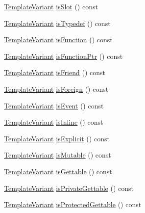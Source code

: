 \begin{DoxyCompactItemize}
\item 
\hyperlink{class_template_variant}{Template\+Variant} \hyperlink{class_member_context_1_1_private_a351015cef8c35ffd0ba7b9b71718af68}{is\+Slot} () const 
\item 
\hyperlink{class_template_variant}{Template\+Variant} \hyperlink{class_member_context_1_1_private_a445e2a687123e29a446fcf61113e37c4}{is\+Typedef} () const 
\item 
\hyperlink{class_template_variant}{Template\+Variant} \hyperlink{class_member_context_1_1_private_afe669b6cb3d29b7ecc8269a4fe3f3625}{is\+Function} () const 
\item 
\hyperlink{class_template_variant}{Template\+Variant} \hyperlink{class_member_context_1_1_private_a07b06053df395fd2a0a3e428c711bdbd}{is\+Function\+Ptr} () const 
\item 
\hyperlink{class_template_variant}{Template\+Variant} \hyperlink{class_member_context_1_1_private_ab55c854a4e2555ce921abdd61ab7102a}{is\+Friend} () const 
\item 
\hyperlink{class_template_variant}{Template\+Variant} \hyperlink{class_member_context_1_1_private_a3f6566c276009070f758343f2d25952f}{is\+Foreign} () const 
\item 
\hyperlink{class_template_variant}{Template\+Variant} \hyperlink{class_member_context_1_1_private_a57eac3accb6dbedea75760c2b9e3e349}{is\+Event} () const 
\item 
\hyperlink{class_template_variant}{Template\+Variant} \hyperlink{class_member_context_1_1_private_a06e5838ec19f7f20b288b440cc3a5061}{is\+Inline} () const 
\item 
\hyperlink{class_template_variant}{Template\+Variant} \hyperlink{class_member_context_1_1_private_a2fa24b0d7f3e25c01e626a1c319b52b5}{is\+Explicit} () const 
\item 
\hyperlink{class_template_variant}{Template\+Variant} \hyperlink{class_member_context_1_1_private_af05202a94616b6c591795eb4109667b0}{is\+Mutable} () const 
\item 
\hyperlink{class_template_variant}{Template\+Variant} \hyperlink{class_member_context_1_1_private_a16820411b9ad9f37a330eca9b2bd8e42}{is\+Gettable} () const 
\item 
\hyperlink{class_template_variant}{Template\+Variant} \hyperlink{class_member_context_1_1_private_af264161efbfe476a5696bb328c2197b8}{is\+Private\+Gettable} () const 
\item 
\hyperlink{class_template_variant}{Template\+Variant} \hyperlink{class_member_context_1_1_private_a677f3536c3e8f338de9fab9accf87ab5}{is\+Protected\+Gettable} () const 

\end{DoxyCompactItemize}
